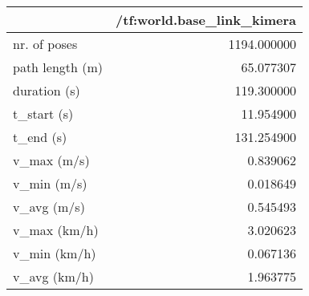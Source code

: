 \begin{tabular}{lr}
\toprule
{} &  /tf:world.base\_link\_kimera \\
\midrule
nr. of poses    &                 1194.000000 \\
path length (m) &                   65.077307 \\
duration (s)    &                  119.300000 \\
t\_start (s)     &                   11.954900 \\
t\_end (s)       &                  131.254900 \\
v\_max (m/s)     &                    0.839062 \\
v\_min (m/s)     &                    0.018649 \\
v\_avg (m/s)     &                    0.545493 \\
v\_max (km/h)    &                    3.020623 \\
v\_min (km/h)    &                    0.067136 \\
v\_avg (km/h)    &                    1.963775 \\
\bottomrule
\end{tabular}
